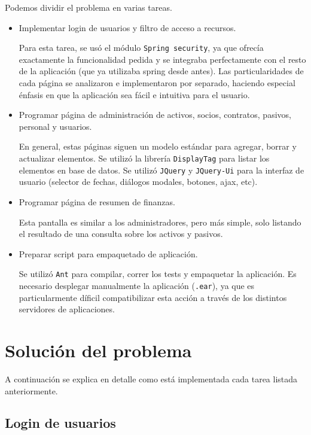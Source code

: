 \documentclass[letter]{article}
\begin{document}
Podemos dividir el problema en varias tareas.
\begin{itemize}
\item Implementar login de usuarios y filtro de acceso a recursos.

 Para esta tarea, se usó el módulo \texttt{Spring security}, ya que ofrecía exactamente la funcionalidad pedida y se integraba perfectamente con el resto de la aplicación (que ya utilizaba spring desde antes). Las particularidades de cada página se analizaron e implementaron por separado, haciendo especial énfasis en que la aplicación sea fácil e intuitiva para el usuario.

\item Programar página de administración de activos, socios, contratos, pasivos, personal y usuarios.

En general, estas páginas siguen un modelo estándar para agregar, borrar y actualizar elementos. Se utilizó la librería \texttt{DisplayTag} para listar los elementos en base de datos. Se utilizó \texttt{JQuery} y \texttt{JQuery-Ui} para la interfaz de usuario (selector de fechas, diálogos modales, botones, ajax, etc).

\item Programar página de resumen de finanzas.

Esta pantalla es similar a los administradores, pero más simple, solo listando el resultado de una consulta sobre los activos y pasivos.

\item Preparar script para empaquetado de aplicación.

Se utilizó \texttt{Ant} para compilar, correr los tests y empaquetar la aplicación. Es necesario desplegar manualmente la aplicación (\texttt{.ear}), ya que es particularmente díficil compatibilizar esta acción a través de los distintos servidores de aplicaciones.

\end{itemize}

\newpage
\section{Solución del problema}

A continuación se explica en detalle como está implementada cada tarea listada anteriormente.

\subsection{Login de usuarios}
\end{document}
